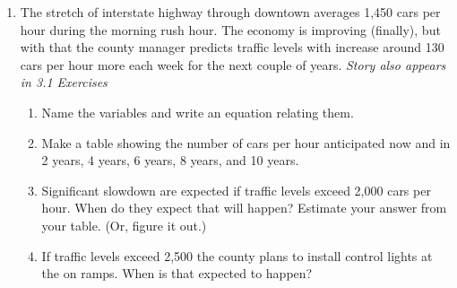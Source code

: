 \begin{enumerate}
\item The stretch of interstate highway through downtown averages 1,450 cars per hour during the morning rush hour.  The economy is improving (finally), but with that the county manager predicts traffic levels with increase around 130 cars per hour more each week for the next couple of years. \hfill \emph{Story also appears in 3.1 Exercises}
\begin{enumerate}
\item Name the variables and write an equation relating them.
\item Make a table showing the number of cars per hour anticipated now and in 2 years, 4 years, 6 years, 8 years, and 10 years.
\item Significant slowdown are expected if traffic levels exceed 2,000 cars per hour.  When do they expect that will happen? Estimate your answer from your table.  (Or, figure it out.)
\item If traffic levels exceed 2,500 the county plans to install control lights at the on ramps.  When is that expected to happen?   
\end{enumerate} 

\end{enumerate}


